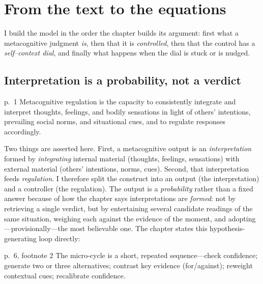 \documentclass[11pt]{article}
\begin{document}
\section{From the text to the equations}
\label{sec:model}

I build the model in the order the chapter builds its argument: first what a metacognitive judgment \emph{is}, then that it is \emph{controlled}, then that the control has a \emph{self--context dial}, and finally what happens when the dial is stuck or is nudged.

\subsection{Interpretation is a probability, not a verdict}

\begin{fromtext}{p.~1}
Metacognitive regulation is the capacity to consistently integrate and interpret thoughts, feelings, and bodily sensations in light of others' intentions, prevailing social norms, and situational cues, and to regulate responses accordingly.
\end{fromtext}

\noindent Two things are asserted here. First, a metacognitive output is an \emph{interpretation} formed by \emph{integrating} internal material (thoughts, feelings, sensations) with external material (others' intentions, norms, cues). Second, that interpretation feeds \emph{regulation}. I therefore split the construct into an output (the interpretation) and a controller (the regulation). The output is a \emph{probability} rather than a fixed answer because of how the chapter says interpretations are \emph{formed}: not by retrieving a single verdict, but by entertaining several candidate readings of the same situation, weighing each against the evidence of the moment, and adopting---provisionally---the most believable one. The chapter states this hypothesis-generating loop directly:

\begin{fromtext}{p.~6, footnote 2}
The micro-cycle is a short, repeated sequence---check confidence; generate two or three alternatives; contrast key evidence (for/against); reweight contextual cues; recalibrate confidence.
\end{fromtext}
\end{document}
